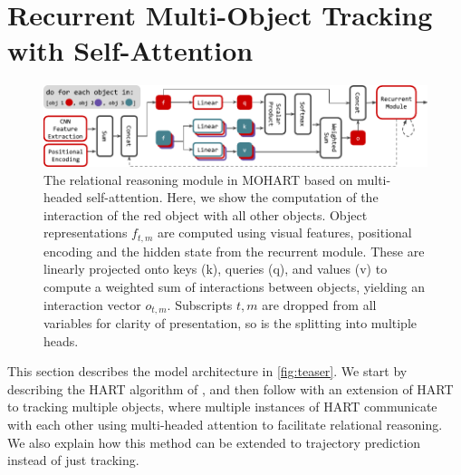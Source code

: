 \section{Recurrent Multi-Object Tracking with Self-Attention}
\label{sec:mohart_method}

\begin{figure}
	\centering
	\includegraphics[width=\linewidth]{figures/MOHART/sab.pdf}
	\caption{
		The relational reasoning module in \Gls{MOHART} based on multi-headed self-attention. Here, we show the computation of the interaction of the red object with all other objects. Object representations $f_{t,m}$ are computed using visual features, positional encoding and the hidden state from the recurrent module. These are linearly projected onto keys (k), queries (q), and values (v) to compute a weighted sum of interactions between objects, yielding an interaction vector $o_{t,m}$. Subscripts $t, m$ are dropped from all variables for clarity of presentation, so is the splitting into multiple heads.
	}
	\label{fig:sab}
\end{figure}

This section describes the model architecture in \cref{fig:teaser}. We start by describing the \gls{HART} algorithm of , and then follow with an extension of \gls{HART} to tracking multiple objects, where multiple instances of \gls{HART} communicate with each other using multi-headed attention to facilitate relational reasoning. We also explain how this method can be extended to trajectory prediction instead of just tracking. 

